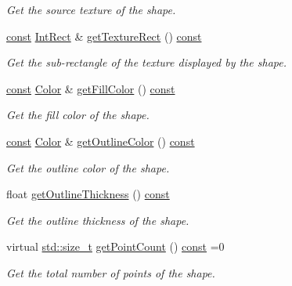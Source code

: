 \begin{DoxyCompactItemize}
\begin{DoxyCompactList}\small\item\em Get the source texture of the shape. \end{DoxyCompactList}\item 
\hyperlink{term__entry_8h_a57bd63ce7f9a353488880e3de6692d5a}{const} \hyperlink{namespacesf_a1b1279ab06950b96686cffaacb72fed5}{Int\-Rect} \& \hyperlink{classsf_1_1_shape_af7c4c80a435b85a622812711cf510439}{get\-Texture\-Rect} () \hyperlink{term__entry_8h_a57bd63ce7f9a353488880e3de6692d5a}{const} 
\begin{DoxyCompactList}\small\item\em Get the sub-\/rectangle of the texture displayed by the shape. \end{DoxyCompactList}\item 
\hyperlink{term__entry_8h_a57bd63ce7f9a353488880e3de6692d5a}{const} \hyperlink{classsf_1_1_color}{Color} \& \hyperlink{classsf_1_1_shape_ad7f7fe601a8bb24efe9aa77809a35c12}{get\-Fill\-Color} () \hyperlink{term__entry_8h_a57bd63ce7f9a353488880e3de6692d5a}{const} 
\begin{DoxyCompactList}\small\item\em Get the fill color of the shape. \end{DoxyCompactList}\item 
\hyperlink{term__entry_8h_a57bd63ce7f9a353488880e3de6692d5a}{const} \hyperlink{classsf_1_1_color}{Color} \& \hyperlink{classsf_1_1_shape_a4fa7d3bf5ee2332f6b9d9bebe9b1e2fd}{get\-Outline\-Color} () \hyperlink{term__entry_8h_a57bd63ce7f9a353488880e3de6692d5a}{const} 
\begin{DoxyCompactList}\small\item\em Get the outline color of the shape. \end{DoxyCompactList}\item 
float \hyperlink{classsf_1_1_shape_ac66f917b41eda6159a8ba6571d77f2ad}{get\-Outline\-Thickness} () \hyperlink{term__entry_8h_a57bd63ce7f9a353488880e3de6692d5a}{const} 
\begin{DoxyCompactList}\small\item\em Get the outline thickness of the shape. \end{DoxyCompactList}\item 
virtual \hyperlink{nc__alloc_8h_a7b60c5629e55e8ec87a4547dd4abced4}{std\-::size\-\_\-t} \hyperlink{classsf_1_1_shape_af988dd61a29803fc04d02198e44b5643}{get\-Point\-Count} () \hyperlink{term__entry_8h_a57bd63ce7f9a353488880e3de6692d5a}{const} =0
\begin{DoxyCompactList}\small\item\em Get the total number of points of the shape. \end{DoxyCompactList}\item 

\end{DoxyCompactItemize}
